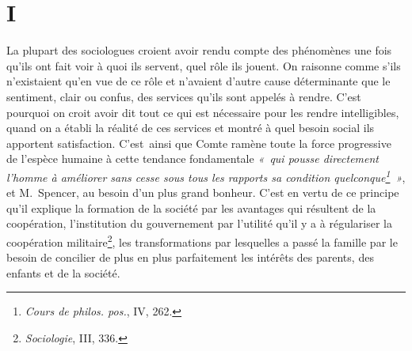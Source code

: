 \documentclass[french,twoside]{book} %
\begin{document}
\section[{I}]{I}
\noindent La plupart des sociologues croient avoir rendu compte des phénomènes une fois qu’ils ont fait voir à quoi ils servent, quel rôle ils jouent. On raisonne comme s’ils n’existaient qu’en vue de ce rôle et n’avaient d’autre cause déterminante que le sentiment, clair ou confus, des services qu’ils sont appelés à rendre. C’est pourquoi on croit avoir dit tout ce qui est nécessaire pour les rendre intelligibles, quand on a établi la réalité de ces services et montré à quel besoin social ils apportent satisfaction. C’est ainsi que Comte ramène toute la force progressive de l’espèce humaine à cette tendance fondamentale \emph{« qui pousse directement l’homme à améliorer sans cesse sous tous les rapports sa condition quelconque\footnote{\emph{Cours de philos. pos.}, IV, 262.} »}, et M. Spencer, au besoin d’un plus grand bonheur. C’est en vertu de ce principe qu’il explique la formation de la société par les avantages qui résultent de la coopération, l’institution du gouvernement par l’utilité qu’il y a à régulariser la coopération militaire\footnote{\emph{Sociologie}, III, 336.}, les transformations par lesquelles a passé la famille par le besoin de concilier de plus en plus parfaitement les intérêts des parents, des enfants et de la société.\par
\end{document}
